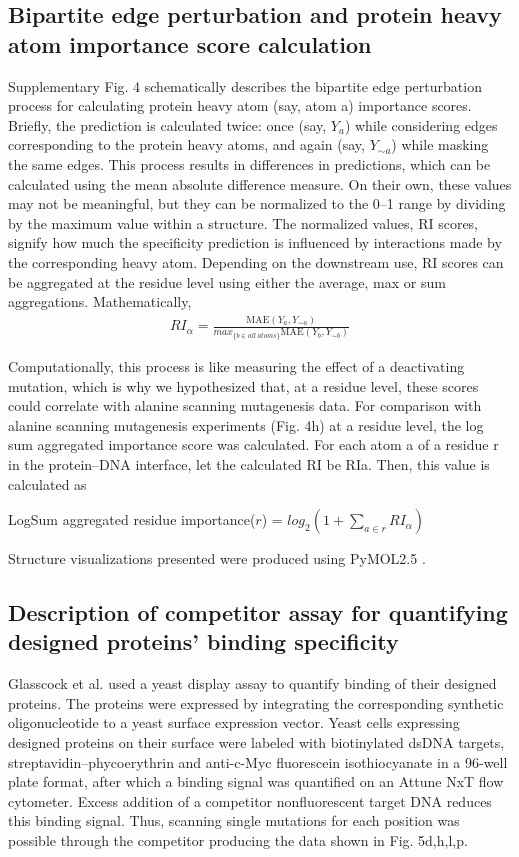 \subsection{Bipartite edge perturbation and protein heavy atom importance score calculation}
Supplementary Fig. 4 schematically describes the bipartite edge perturbation process for calculating protein heavy atom (say, atom a) importance scores. Briefly, the prediction is calculated twice: once (say, $Y_a$) while considering edges corresponding to the protein heavy atoms, and again (say, $Y_{\sim a}$) while masking the same edges. This process results in differences in predictions, which can be calculated using the mean absolute difference measure. On their own, these values may not be meaningful, but they can be normalized to the 0–1 range by dividing by the maximum value within a structure. The normalized values, RI scores, signify how much the specificity prediction is influenced by interactions made by the corresponding heavy atom. Depending on the downstream use, RI scores can be aggregated at the residue level using either the average, max or sum aggregations. Mathematically,
\begin{align} 
RI_\alpha = 
\frac{\text{MAE}(Y_a,Y_{\sim a})}
{max_{\{b\in all\ atoms\}}\text{MAE}(Y_b,Y_{\sim b})}
\end{align}
\par
Computationally, this process is like measuring the effect of a deactivating mutation, which is why we hypothesized that, at a residue level, these scores could correlate with alanine scanning mutagenesis data. For comparison with alanine scanning mutagenesis experiments (Fig. 4h) at a residue level, the log sum aggregated importance score was calculated. For each atom a of a residue r in the protein–DNA interface, let the calculated RI be RIa. Then, this value is calculated as
\begin{center}
LogSum aggregated residue importance($r$) = $log_2(1 + \sum\limits_{a\in r}RI_\alpha)$ %
\end{center}
Structure visualizations presented were produced using PyMOL2.5 \citep{pymol}.

\subsection{Description of competitor assay for quantifying designed proteins’ binding specificity}

Glasscock et al. \citep{Glasscock2023} used a yeast display assay to quantify binding of their designed proteins. The proteins were expressed by integrating the corresponding synthetic oligonucleotide to a yeast surface expression vector. Yeast cells expressing designed proteins on their surface were labeled with biotinylated dsDNA targets, streptavidin–phycoerythrin and anti-c-Myc fluorescein isothiocyanate in a 96-well plate format, after which a binding signal was quantified on an Attune NxT flow cytometer. Excess addition of a competitor nonfluorescent target DNA reduces this binding signal. Thus, scanning single mutations for each position was possible through the competitor producing the data shown in Fig. 5d,h,l,p.
\\
